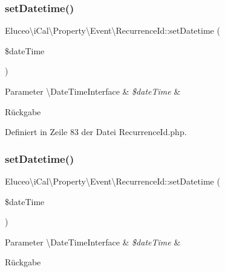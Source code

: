\subsubsection{\texorpdfstring{set\+Datetime()}{setDatetime()}\hspace{0.1cm}{\footnotesize\ttfamily [2/3]}}
{\footnotesize\ttfamily Eluceo\textbackslash{}i\+Cal\textbackslash{}\+Property\textbackslash{}\+Event\textbackslash{}\+Recurrence\+Id\+::set\+Datetime (\begin{DoxyParamCaption}\item[{\textbackslash{}Date\+Time\+Interface}]{\$date\+Time }\end{DoxyParamCaption})}


\begin{DoxyParams}[1]{Parameter}
\textbackslash{}\+Date\+Time\+Interface & {\em \$date\+Time} & \\
\hline
\end{DoxyParams}
\begin{DoxyReturn}{Rückgabe}

\end{DoxyReturn}


Definiert in Zeile 83 der Datei Recurrence\+Id.\+php.

\mbox{\label{class_eluceo_1_1i_cal_1_1_property_1_1_event_1_1_recurrence_id_a348cc32d3b8f03cac585f6eb19ee930f}} 
\subsubsection{\texorpdfstring{set\+Datetime()}{setDatetime()}\hspace{0.1cm}{\footnotesize\ttfamily [3/3]}}
{\footnotesize\ttfamily Eluceo\textbackslash{}i\+Cal\textbackslash{}\+Property\textbackslash{}\+Event\textbackslash{}\+Recurrence\+Id\+::set\+Datetime (\begin{DoxyParamCaption}\item[{\textbackslash{}Date\+Time\+Interface}]{\$date\+Time }\end{DoxyParamCaption})}


\begin{DoxyParams}[1]{Parameter}
\textbackslash{}\+Date\+Time\+Interface & {\em \$date\+Time} & \\
\hline
\end{DoxyParams}
\begin{DoxyReturn}{Rückgabe}

\end{DoxyReturn}


